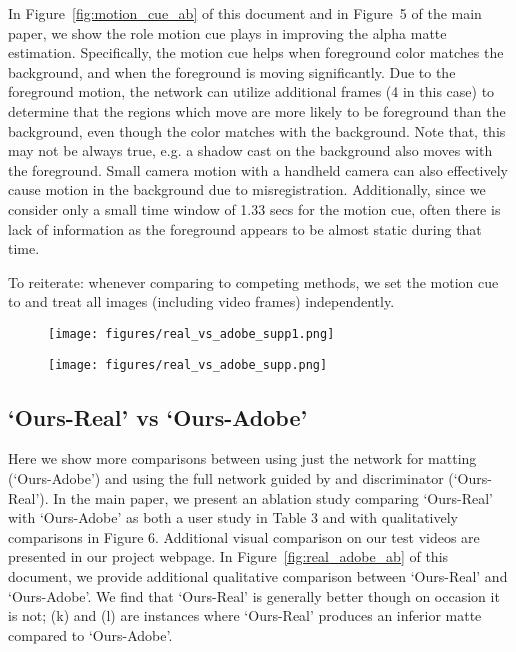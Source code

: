 \documentclass[10pt,twocolumn,letterpaper]{article}
\begin{document}
In Figure~\ref{fig:motion_cue_ab} of this document and in Figure~5 of the main paper, we show the role motion cue plays in improving the alpha matte estimation. Specifically, the motion cue helps when foreground color matches the background, and when the foreground is moving significantly. Due to the foreground motion, the network can utilize additional frames (4 in this case) to determine that the regions which move are more likely to be foreground than the background, even though the color matches with the background. Note that, this may not be always true, e.g. a shadow cast on the background also moves with the foreground. Small camera motion with a handheld camera can also effectively cause motion in the background due to misregistration. Additionally, since we consider only a small time window of 1.33 secs for the motion cue, often there is lack of information as the foreground appears to be almost static during that time. 

To reiterate: whenever comparing to competing methods, we set the motion cue to  and treat all images (including video frames) independently.



\begin{figure*}[!ht]
	\centering
	
	\begin{subfigure}[b]{1\textwidth}
  \texttt{[image: figures/real\_vs\_adobe\_supp1.png]}\end{subfigure}
\qquad
\begin{subfigure}[b]{1\textwidth}\texttt{[image: figures/real\_vs\_adobe\_supp.png]}\end{subfigure}

	\caption{\small \textbf{Ours-Real vs Ours-Adobe.} `Ours-Real' is trained on real data guided by `Ours-Adobe' (trained on synthetic-composite dataset) along with an adversarial loss. (k) and (l) are instances where `Ours-Real' produces worse result compared to `Ours-Adobe'.}
\label{fig:real_adobe_ab}	
\end{figure*}




\subsection{`Ours-Real' vs `Ours-Adobe'}
\label{sec:real_vs_syn}

Here we show more comparisons between using just the  network for matting (`Ours-Adobe') and using the full network  guided by  and discriminator  (`Ours-Real').  In the main paper, we present an ablation study comparing `Ours-Real' with `Ours-Adobe' as both a user study in Table 3 and with qualitatively comparisons in Figure 6. Additional visual comparison on our test videos are presented in our project webpage. In Figure~\ref{fig:real_adobe_ab} of this document, we provide additional qualitative comparison between `Ours-Real' and `Ours-Adobe'. We find that `Ours-Real' is generally better though on occasion it is not; (k) and (l) are instances where `Ours-Real' produces an inferior matte compared to `Ours-Adobe'.
\end{document}

